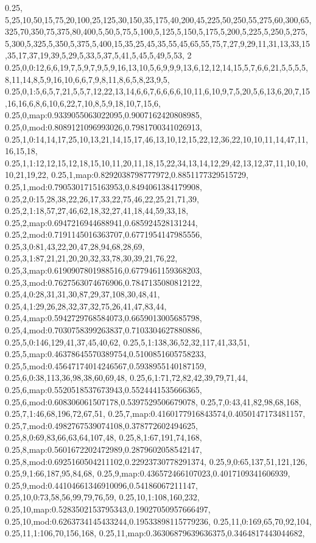 0.25,
5,25,10,50,15,75,20,100,25,125,30,150,35,175,40,200,45,225,50,250,55,275,60,300,65,325,70,350,75,375,80,400,5,50,5,75,5,100,5,125,5,150,5,175,5,200,5,225,5,250,5,275,5,300,5,325,5,350,5,375,5,400,15,35,25,45,35,55,45,65,55,75,7,27,9,29,11,31,13,33,15,35,17,37,19,39,5,29,5,33,5,37,5,41,5,45,5,49,5,53,
2
0.25,0,0:12,6,6,19,7,5,9,7,9,5,9,16,13,10,5,6,9,9,9,13,6,12,12,14,15,5,7,6,6,21,5,5,5,5,8,11,14,8,5,9,16,10,6,6,7,9,8,11,8,6,5,8,23,9,5,
0.25,0,1:5,6,5,7,21,5,5,7,12,22,13,14,6,6,7,6,6,6,6,10,11,6,10,9,7,5,20,5,6,13,6,20,7,15,16,16,6,8,6,10,6,22,7,10,8,5,9,18,10,7,15,6,
0.25,0,map:0.9339055063022095,0.9007162420808985,
0.25,0,mod:0.8089121096993026,0.7981700341026913,
0.25,1,0:14,14,17,25,10,13,21,14,15,17,46,13,10,12,15,22,12,36,22,10,10,11,14,47,11,16,15,18,
0.25,1,1:12,12,15,12,18,15,10,11,20,11,18,15,22,34,13,14,12,29,42,13,12,37,11,10,10,10,21,19,22,
0.25,1,map:0.8292038798777972,0.8851177329515729,
0.25,1,mod:0.7905301715163953,0.8494061384179908,
0.25,2,0:15,28,38,22,26,17,33,22,75,46,22,25,21,71,39,
0.25,2,1:18,57,27,46,62,18,32,27,41,18,44,59,33,18,
0.25,2,map:0.6947216944688941,0.685924528131244,
0.25,2,mod:0.7191145016363707,0.6771954147985556,
0.25,3,0:81,43,22,20,47,28,94,68,28,69,
0.25,3,1:87,21,21,20,20,32,33,78,30,39,21,76,22,
0.25,3,map:0.6190907801988516,0.6779461159368203,
0.25,3,mod:0.7627563074676906,0.7847135080812122,
0.25,4,0:28,31,31,30,87,29,37,108,30,48,41,
0.25,4,1:29,26,28,32,37,32,75,26,41,47,83,44,
0.25,4,map:0.5942729768584073,0.6659013005685798,
0.25,4,mod:0.7030758399263837,0.7103304627880886,
0.25,5,0:146,129,41,37,45,40,62,
0.25,5,1:138,36,52,32,117,41,33,51,
0.25,5,map:0.46378645570389754,0.5100851605758233,
0.25,5,mod:0.45647174014246567,0.5938955140187159,
0.25,6,0:38,113,36,98,38,60,69,48,
0.25,6,1:71,72,82,42,39,79,71,44,
0.25,6,map:0.5520518537673943,0.5524441535666365,
0.25,6,mod:0.608306061507178,0.5397529506679078,
0.25,7,0:43,41,82,98,68,168,
0.25,7,1:46,68,196,72,67,51,
0.25,7,map:0.4160177916843574,0.4050147173481157,
0.25,7,mod:0.4982767539074108,0.378772602494625,
0.25,8,0:69,83,66,63,64,107,48,
0.25,8,1:67,191,74,168,
0.25,8,map:0.5601672202472989,0.2879602058542147,
0.25,8,mod:0.6925160504211102,0.22923730778291374,
0.25,9,0:65,137,51,121,126,
0.25,9,1:66,187,95,84,68,
0.25,9,map:0.436572466107023,0.4017109341606939,
0.25,9,mod:0.44104661346910096,0.54186067211147,
0.25,10,0:73,58,56,99,79,76,59,
0.25,10,1:108,160,232,
0.25,10,map:0.5283502153795343,0.19027050957666497,
0.25,10,mod:0.6263734145433244,0.19533898115779236,
0.25,11,0:169,65,70,92,104,
0.25,11,1:106,70,156,168,
0.25,11,map:0.36306879639636375,0.3464817443044682,
